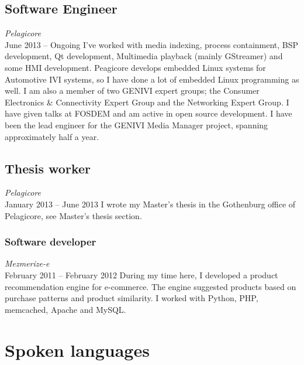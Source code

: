 \documentclass{twocolcv}
\begin{document}
\subsection*{Software Engineer}
\emph{Pelagicore}\\
June 2013 -- Ongoing \newline\newline
I've worked with media indexing, process containment, BSP development, Qt development, Multimedia playback (mainly GStreamer) and some HMI development. Peagicore develops embedded Linux systems for Automotive IVI systems, so I have done a lot of embedded Linux programming as well. I am also a member of two GENIVI expert groups; the Consumer Electronics \& Connectivity Expert Group and the Networking Expert Group. I have given talks at FOSDEM and am active in open source development. I have been the lead engineer for the GENIVI Media Manager project, spanning approximately half a year.

\subsection*{Thesis worker}
\emph{Pelagicore}\\
January 2013 -- June 2013 \newline\newline
I wrote my Master's thesis in the Gothenburg office of Pelagicore, see Master's thesis section.

\subsubsection*{Software developer}
\emph{Mezmerize-e} \\
February 2011 -- February 2012\newline\newline
During my time here, I developed a product recommendation engine for e-commerce. The engine suggested products based on purchase patterns and product similarity. I worked with Python, PHP, memcached, Apache and MySQL.

\section*{Spoken languages}
\end{document}
